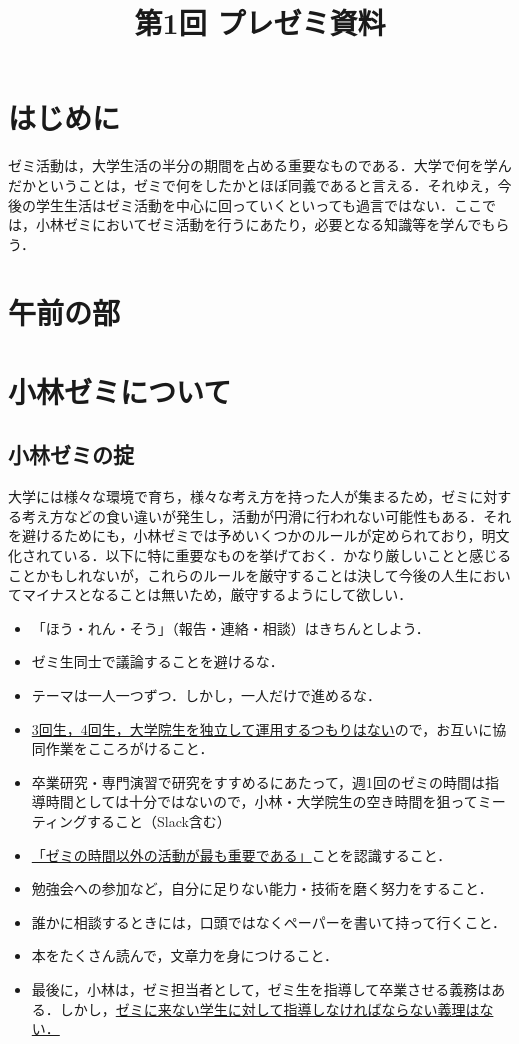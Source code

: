 \documentclass[11pt]{jarticle}
\title{第1回 プレゼミ資料}
\begin{document}
\maketitle
%
% 
\section*{はじめに}
ゼミ活動は，大学生活の半分の期間を占める重要なものである．大学で何を学んだかということは，ゼミで何をしたかとほぼ同義であると言える．それゆえ，今後の学生生活はゼミ活動を中心に回っていくといっても過言ではない．ここでは，小林ゼミにおいてゼミ活動を行うにあたり，必要となる知識等を学んでもらう．

\section*{午前の部}
\section{小林ゼミについて}
\subsection{小林ゼミの掟}
大学には様々な環境で育ち，様々な考え方を持った人が集まるため，ゼミに対する考え方などの食い違いが発生し，活動が円滑に行われない可能性もある．それを避けるためにも，小林ゼミでは予めいくつかのルールが定められており，明文化されている．以下に特に重要なものを挙げておく．かなり厳しいことと感じることかもしれないが，これらのルールを厳守することは決して今後の人生においてマイナスとなることは無いため，厳守するようにして欲しい．

\begin{boxnote}
	\begin{itemize}
		\item 「ほう・れん・そう」（報告・連絡・相談）はきちんとしよう．
		\item ゼミ生同士で議論することを避けるな．
		\item テーマは一人一つずつ．しかし，一人だけで進めるな．
		\item \underline{3回生，4回生，大学院生を独立して運用するつもりはない}ので，お互いに協同作業をこころがけること．
		\item 卒業研究・専門演習で研究をすすめるにあたって，週1回のゼミの時間は指導時間としては十分ではないので，小林・大学院生の空き時間を狙ってミーティングすること（Slack含む）
		\item \underline{「ゼミの時間以外の活動が最も重要である」}ことを認識すること．
		\item 勉強会への参加など，自分に足りない能力・技術を磨く努力をすること．
		\item 誰かに相談するときには，口頭ではなくペーパーを書いて持って行くこと．
		\item 本をたくさん読んで，文章力を身につけること．
		\item 最後に，小林は，ゼミ担当者として，ゼミ生を指導して卒業させる義務はある．しかし，\underline{ゼミに来ない学生に対して指導しなければならない義理はない．}
	\end{itemize}
\end{boxnote}
\end{document}
